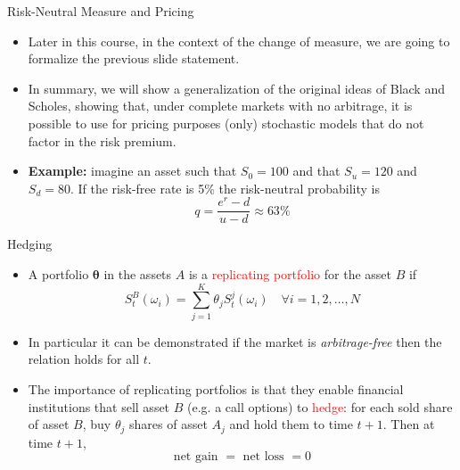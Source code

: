 \documentclass{beamer}
\begin{document}
\begin{frame}{Risk-Neutral Measure and Pricing}
	\begin{itemize}
		\item Later in this course, in the context of the change of measure, we are going to formalize the previous slide statement.
		\item In summary, we will show a generalization of the original ideas of Black and Scholes, showing that, under complete markets with no arbitrage, it is possible to use for pricing purposes (only) stochastic models that do not factor in the risk premium.
		\item \textbf{Example:} imagine an asset such that $S_0=100$ and that $S_u=120$ and $S_d=80$. If the risk-free rate is 5\% the risk-neutral probability is 
		\begin{equation*}
		q = \frac{e^r - d}{u-d} \approx 63\%
		\end{equation*}
	\end{itemize}
\end{frame}

\begin{frame}{Hedging}
	\begin{itemize}
		\item A portfolio $\mathbf{\theta}$ in the assets $A$ is a \textcolor{red}{replicating portfolio} for the asset $B$ if
		\begin{equation}
			S_t^{B}(\omega_i) = \sum_{j=1}^K \theta_j S_t^j(\omega_i)\quad\forall i=1,2,\ldots,N
		\end{equation}
		\item In particular it can be demonstrated if the market is \emph{arbitrage-free} then the relation holds for all $t$.
		\item The importance of replicating portfolios is that they enable financial institutions that sell
		asset $B$ (e.g. a call options) to \textcolor{red}{hedge}: for each sold share of asset $B$, buy $\theta_j$ shares
		of asset $A_j$ and hold them to time $t + 1$. Then at time $t + 1$, 
		\begin{equation*}
			\text{net gain }= \text{ net loss } = 0
		\end{equation*}
	\end{itemize}
\end{frame}
\end{document}
